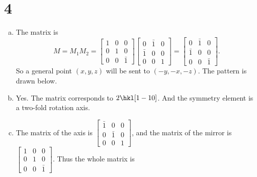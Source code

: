 \documentclass[openany]{homework}
\begin{document}
\section*{4}
\begin{enumerate}[a.]
        \item The matrix is
        \begin{equation}
         M = M_1 M_2 = 
                \begin{bmatrix}
                       1 & 0 & 0\\
                       0 & 1 & 0\\
                       0 & 0 & \bar{1}
                \end{bmatrix}
                \begin{bmatrix}
                        0 & \bar{1} & 0\\
                        \bar{1} & 0 & 0\\
                        0 & 0 & 1
                \end{bmatrix} = 
                \begin{bmatrix}
                        0 & \bar{1} & 0\\
                        \bar{1} & 0 & 0\\
                        0 & 0 & \bar{1}
                \end{bmatrix}.
        \end{equation}
        So a general point $(x, y, z)$ will be sent to $(-y, -x, -z)$. The pattern is drawn below.
        \item Yes. The matrix corresponds to $2 \hkl[1 -1 0]$. And the symmetry element is a two-fold rotation axis.
        \item The matrix of the axis is 
        $\left[\begin{smallmatrix}
                \bar{1} & 0 & 0\\
                0           & \bar{1} & 0\\
                0              & 0     & 1
        \end{smallmatrix}\right]$,
        and the matrix of the mirror is
        $\left[\begin{smallmatrix}
                1 & 0 & 0\\
                0 & 1 & 0\\
                0 & 0 & \bar{1}
        \end{smallmatrix}\right]$. Thus the whole matrix is
        \begin{equation}

\end{equation}
\end{enumerate}
\end{document}
